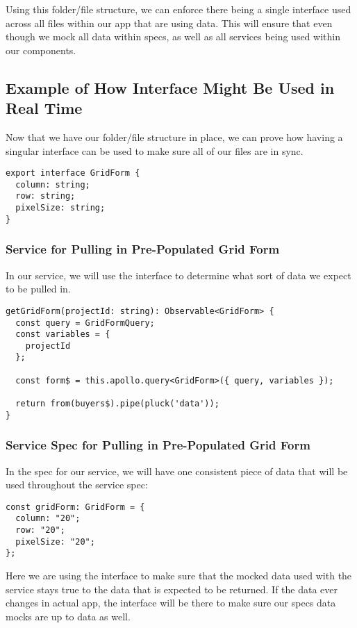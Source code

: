 Using this folder/file structure, we can enforce there being a single interface
used across all files within our app that are using data. This will ensure that
even though we mock all data within specs, as well as all services being used
within our components.

\subsection{ Example of How Interface Might Be Used in Real Time }
Now that we have our folder/file structure in place, we can prove how having a
singular interface can be used to make sure all of our files are in sync.

\begin{lstlisting}
export interface GridForm {
  column: string;
  row: string;
  pixelSize: string;
}
\end{lstlisting}

\subsubsection{ Service for Pulling in Pre-Populated Grid Form }
In our service, we will use the interface to determine what sort of data we
expect to be pulled in.

\begin{lstlisting}
getGridForm(projectId: string): Observable<GridForm> {
  const query = GridFormQuery;
  const variables = {
    projectId
  };

  const form$ = this.apollo.query<GridForm>({ query, variables });

  return from(buyers$).pipe(pluck('data'));
}
\end{lstlisting}

\subsubsection{ Service Spec for Pulling in Pre-Populated Grid Form }
In the spec for our service, we will have one consistent piece of data that will
be used throughout the service spec:
\begin{lstlisting}
const gridForm: GridForm = {
  column: "20";
  row: "20";
  pixelSize: "20";
};
\end{lstlisting}

Here we are using the interface to make sure that the mocked data used with the
service stays true to the data that is expected to be returned. If the data
ever changes in actual app, the interface will be there to make sure our specs
data mocks are up to data as well.

